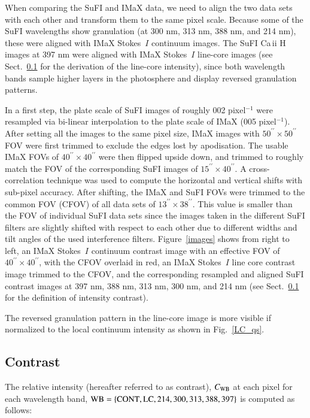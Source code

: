 \documentclass[goettingen, gauss, print]{thesis}
\begin{document}
When comparing the SuFI and IMaX data, we need to align the two data sets with each other and transform them to the same pixel scale. Because some of the SuFI wavelengths show granulation (at 300 nm, 313 nm, 388 nm, and 214 nm), these were aligned with IMaX Stokes~$I$ continuum images. The SuFI Ca\,{\sc ii} H images at 397 nm were aligned with IMaX Stokes~$I$ line-core images (see Sect.~\ref{contrast_def} for the derivation of the line-core intensity), since both wavelength bands sample higher layers in the photosphere and display reversed granulation patterns.

In a first step, the plate scale of SuFI images of roughly 0\carcsec{}02 pixel$^{-1}$ were resampled via bi-linear interpolation to the plate scale of IMaX (0\carcsec{}05 pixel$^{-1}$). After setting all the images to the same pixel size, IMaX images with $50^{\prime\prime}\times50^{\prime\prime}$ FOV were first trimmed to exclude the edges lost by apodisation. The usable IMaX FOVs of $40^{\prime\prime}\times40^{\prime\prime}$ were then flipped upside down, and trimmed to roughly match the FOV of the corresponding SuFI images of $15^{\prime\prime}\times40^{\prime\prime}$. A cross-correlation technique was used to compute the horizontal and vertical shifts with sub-pixel accuracy. After shifting, the IMaX and SuFI FOVs  were trimmed to the common FOV (CFOV) of all data sets of $13^{\prime\prime}\times38^{\prime\prime}$. This value is smaller than the FOV of individual SuFI data sets since the images taken in the different SuFI filters are slightly shifted with respect to each other due to different widths and tilt angles of the used interference filters.
Figure~\ref{images} shows from right to left, an IMaX Stokes~$I$ continuum contrast image with an effective FOV of $40^{\prime\prime}\times40^{\prime\prime}$, with the CFOV overlaid in red, an IMaX Stokes~$I$ line core contrast image trimmed to the CFOV,  and the corresponding resampled and aligned SuFI contrast images at 397 nm, 388 nm, 313 nm, 300 nm, and 214 nm (see Sect.~\ref{contrast_def} for the definition of intensity contrast).

The reversed granulation pattern in the line-core image is more visible if normalized to the local continuum intensity as shown in Fig.~\ref{LC_qs}.

\subsection{Contrast}
\label{contrast_def}
The relative intensity (hereafter referred to as contrast), $C_{\rm WB}$ at each pixel for each wavelength band, $\rm WB=\{\rm CONT, \rm LC, 214, 300, 313, 388, 397 \}$ is computed as follows:
\end{document}
